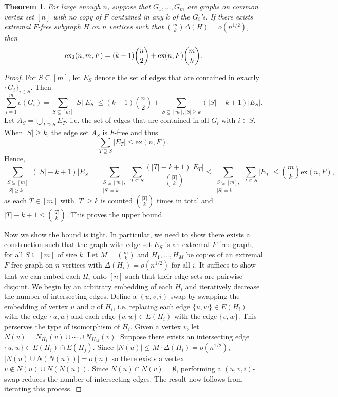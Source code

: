 \documentclass[12pt]{report}
\newtheorem{theorem}{Theorem}[chapter]
\newcommand*{\ex}{\textnormal{ex}}
\newcommand*{\dex}{\textnormal{ex}_2}
\begin{document}
\begin{theorem}
  For large enough $n$, suppose that $G_1, \ldots, G_m$ are graphs on common vertex set $[n]$ with no copy of $F$ contained in any $k$ of the $G_i$'s. If there exists extremal $F$-free subgraph $H$ on $n$ vertices such that $\binom{m}{k}\Delta(H) = o(n^{1/2})$, then
  \[
    \dex(n, m ,F) = (k - 1)\binom{n}{2} + \ex(n, F)\binom{m}{k}.
  \]
\end{theorem}

\begin{proof}
  For $S \subseteq [m]$, let $E_S$ denote the set of edges that are contained in exactly $\{G_i\}_{i \in S}$. Then 
  \[
    \sum_{i = 1}^m e(G_i) = \sum_{S \subseteq [m]} |S||E_S| \leq (k - 1)\binom{n}{2} + \sum_{S \subseteq [m], |S| \geq k} (|S| - k + 1)|E_S|.
  \]
  Let $A_S = \bigcup_{T \supseteq S} E_T$, i.e. the set of edges that are contained in all $G_i$ with $i \in S$. When $|S| \geq k$, the edge set $A_S$ is $F$-free and thus 
  \[
    \sum_{T \supseteq S} |E_T| \leq \text{ex}(n, F).
  \]
  Hence,
  \[
    \sum_{\substack{S \subseteq [m] \\ |S| \geq k}} (|S| - k + 1)|E_S| = \sum_{\substack{S \subseteq [m], \\ |S| = k}} \sum_{T \subseteq S} \frac{(|T| - k + 1)|E_T|}{\binom{|T|}{k}} \leq \sum_{\substack{S \subseteq [m], \\ |S| = k}} \sum_{T \subseteq S} |E_T| \leq \binom{m}{k}\text{ex}(n, F),
  \]
  as each $T \in [m]$ with $|T| \geq k$ is counted $\binom{|T|}{k}$ times in total and $|T| - k + 1 \leq \binom{|T|}{k}$. This proves the upper bound.

  Now we show the bound is tight. In particular, we need to show there exists a construction such that the graph with edge set $E_S$ is an extremal $F$-free graph, for all $S \subseteq [m]$ of size $k$. Let $M = \binom{m}{k}$ and $H_1, \ldots, H_M$ be copies of an extremal $F$-free graph on $n$ vertices with $\Delta(H_i) = o(n^{1/2})$ for all $i$. It suffices to show that we can embed each $H_i$ onto $[n]$ such that their edge sets are pairwise disjoint. We begin by an arbitrary embedding of each $H_i$ and iteratively decrease the number of intersecting edges. Define a $(u, v, i)$-swap by swapping the embedding of vertex $u$ and $v$ of $H_i$, i.e. replacing each edge $\{u, w\} \in E(H_i)$ with the edge $\{u, w\}$ and each edge $\{v, w\} \in E(H_i)$ with the edge $\{v, w\}$. This perserves the type of isomorphism of $H_i$. Given a vertex $v$, let $N(v) = N_{H_1}(v) \cup \cdots \cup N_{H_M}(v)$. Suppose there exists an intersecting edge $\{u, w\} \in E(H_i) \cap E(H_j)$. Since $|N(u)|
  \leq M \cdot \Delta(H_i) = o(n^{1/2})$, $|N(u) \cup N(N(u))| = o(n)$ so there exists a vertex $v \notin N(u) \cup N(N(u))$. Since $N(u) \cap N(v) = \emptyset$, performing a $(u, v, i)$-swap reduces the number of intersecting edges. The result now follows from iterating this process.
\end{proof}
\end{document}
